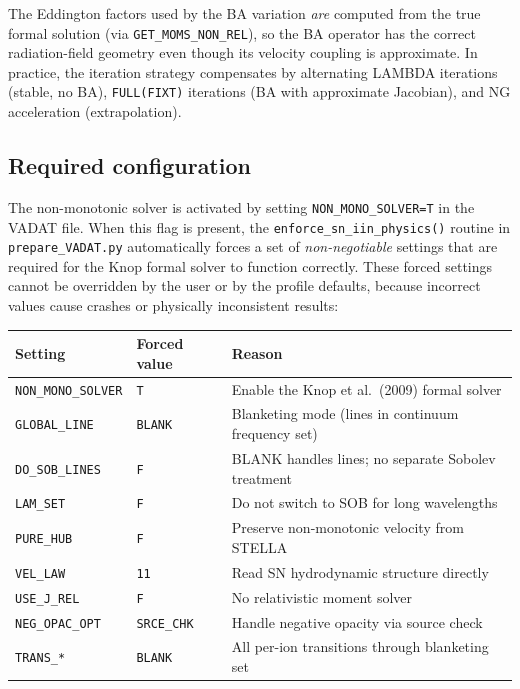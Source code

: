 \documentclass[11pt]{article}
\begin{document}
The Eddington factors used by the BA variation \emph{are} computed from
the true formal solution (via \texttt{GET\_MOMS\_NON\_REL}), so the BA
operator has the correct radiation-field geometry even though its
velocity coupling is approximate.  In practice, the iteration strategy
compensates by alternating LAMBDA iterations (stable, no BA),
\texttt{FULL(FIXT)} iterations (BA with approximate Jacobian), and NG
acceleration (extrapolation).

\subsection{Required configuration}
\label{sec:required-config}

The non-monotonic solver is activated by setting
\texttt{NON\_MONO\_SOLVER=T} in the VADAT file.  When this flag is
present, the \texttt{enforce\_sn\_iin\_physics()} routine in
\texttt{prepare\_VADAT.py} automatically forces a set of
\emph{non-negotiable} settings that are required for the Knop formal
solver to function correctly.  These forced settings cannot be
overridden by the user or by the profile defaults, because incorrect
values cause crashes or physically inconsistent results:

\begin{center}
\begin{tabular}{lll}
\toprule
Setting & Forced value & Reason \\
\midrule
\texttt{NON\_MONO\_SOLVER} & \texttt{T}  & Enable the Knop et al.\ (2009) formal solver \\
\texttt{GLOBAL\_LINE}      & \texttt{BLANK} & Blanketing mode (lines in continuum frequency set) \\
\texttt{DO\_SOB\_LINES}    & \texttt{F}  & BLANK handles lines; no separate Sobolev treatment \\
\texttt{LAM\_SET}          & \texttt{F}  & Do not switch to SOB for long wavelengths \\
\texttt{PURE\_HUB}         & \texttt{F}  & Preserve non-monotonic velocity from STELLA \\
\texttt{VEL\_LAW}          & \texttt{11} & Read SN hydrodynamic structure directly \\
\texttt{USE\_J\_REL}       & \texttt{F}  & No relativistic moment solver \\
\texttt{NEG\_OPAC\_OPT}    & \texttt{SRCE\_CHK} & Handle negative opacity via source check \\
\texttt{TRANS\_*}          & \texttt{BLANK} & All per-ion transitions through blanketing set \\
\bottomrule
\end{tabular}
\end{center}
\end{document}
